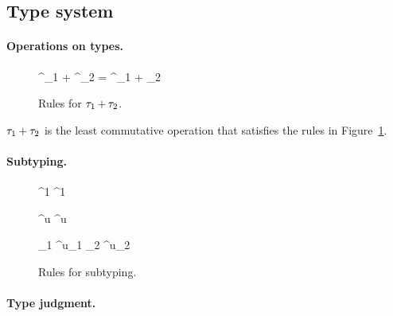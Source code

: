 \documentclass[runningheads]{llncs}
\begin{document}
\subsection{Type system}

\paragraph{Operations on types.}

\begin{figure}[t]
  { \TREF^{\ownership_1} +  \TREF^{\ownership_2} =  \TREF^{\ownership_1 + \ownership_2}}


  \caption{Rules for $\tau_1 \operatorname{+} \tau_2$.}
  \label{fig:addition}
\end{figure}

\begin{definition}
  $\tau_1 + \tau_2$ is the least commutative operation that satisfies the rules in Figure~\ref{fig:addition}.
\end{definition}

\paragraph{Subtyping.}

\begin{figure}[t]

  {\tenv \vdash {} \TREF^1 \subt {} \TREF^1}

  {\tenv \vdash {} \TREF^{u} \subt {} \TREF^{u}}

  {\tenv \vdash \typ_1 \TREF^{u_1} \subt \typ_2 \TREF^{u_2}}
  
  \caption{Rules for subtyping.}
  \label{fig:subtyping}
\end{figure}

\paragraph{Type judgment.}
\end{document}
